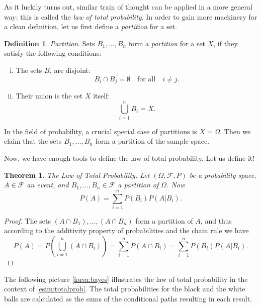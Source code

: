 \documentclass[12pt,a4paper,leqno]{report}
\newcommand{\F}{\mathcal{F}}
\theoremstyle{plain}
\newtheorem{lause}[equation]{Theorem}
\theoremstyle{definition}
\newtheorem{maar}[equation]{Definition}
\begin{document}
As it luckily turns out, similar train of thought can be applied in a more general way: this is called the \emph{law of total probability}. In order to gain more machinery for a clean definition, let us first define a \emph{partition} for a set.

\begin{maar}
\emph{Partition}. Sets $B_1, \dots, B_n$ form a \emph{partition} for a set $X$, if they satisfy the following conditions: 
\begin{enumerate}[(i)]
\item The sets $B_i$ are disjoint:
\[
B_i \cap B_j = \emptyset \quad \text{for all} \quad i \neq j.  
\]
\item Their union is the set $X$ itself:
\[
\bigcup_{i=1}^n B_i = X.
\]
\end{enumerate}
\end{maar}

In the field of probability, a crucial special case of partitions is $X = \Omega$. Then we claim that the sets  $B_1, \dots , B_n$ form a partition of the sample space.

\bigskip

Now, we have enough tools to define the law of total probability. Let us define it!

\begin{lause} \label{lause:totalprob}
The Law of Total Probability. Let $(\Omega, \F, P)$ be a probability space, $A \in \F$ an event, and $B_1, \dots , B_n \in \F$ a partition of $\Omega$. Now
\[
P(A) = \sum_{i=1}^n P(B_i)P(A|B_i).
\] 
\end{lause}

\begin{proof}
The sets $(A \cap B_1), \dots ,(A \cap B_n)$ form a partition of $A$, and thus according to the additivity property of probabilities and the chain rule we have 
\[
P(A) = P\left( \bigcup_{i=1}^n (A \cap B_i) \right) = \sum_{i=1}^n P(A \cap B_i) = \sum_{i=1}^n P(B_i) P(A|B_i).
\]
\end{proof}

The following picture \ref{kuva:bayes} illustrates the law of total probability in the context of \ref{esim:totalprob}. The total probabilities for the black and the white balls are calculated as the sums of the conditional paths resulting in each result.
\end{document}
